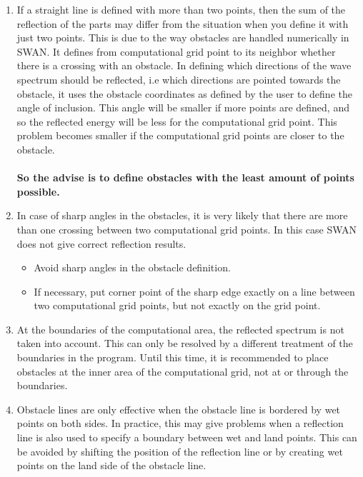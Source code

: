 \documentclass[12pt]{book}
\begin{document}
\begin{enumerate}
\item If a straight line is defined with more than two points, then the sum of the reflection of the parts
      may differ from the situation when you define it with just two points. This is due to the way
      obstacles are handled numerically in SWAN. It defines from computational grid point to its
      neighbor whether there is a crossing with an obstacle. In defining which directions of the wave
      spectrum should be reflected, i.e which directions are pointed towards the obstacle,  it uses the
      obstacle coordinates as defined by the user to define the angle of inclusion. This angle will be
      smaller if more points are defined, and so the reflected energy will be less for the computational
      grid point. This problem becomes smaller if the computational grid points are closer to the
      obstacle.\\
      \\
      {\bf So the advise is to define obstacles with the least amount of points possible.}
\item In case of sharp angles in the obstacles, it is very likely that there are more than one crossing
      between two computational grid points. In this case SWAN does not give correct reflection
      results.
      \begin{itemize}
         \item Avoid sharp angles in the obstacle definition.
         \item If necessary, put corner point of the sharp edge exactly on a line between two computational grid points,
               but not exactly on the grid point.
      \end{itemize}
\item At the boundaries of the computational area, the reflected spectrum is not taken into account.
      This can only be resolved by a different treatment of the boundaries in the program. Until this
      time, it is recommended to place obstacles at the inner area of the computational grid, not at or
      through the boundaries.
\item Obstacle lines are only effective when the obstacle line is bordered by wet points on both sides.
      In practice, this may give problems when a reflection line is also used to specify a boundary between
      wet and land points. This can be avoided by shifting the position of the reflection line or by
      creating wet points on the land side of the obstacle line.
\end{enumerate}
\end{document}
